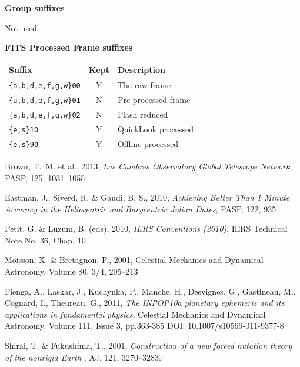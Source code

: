 \documentclass[twoside,11pt]{article}
\renewcommand{\_}{\texttt{\symbol{95}}}
\begin{document}
\vspace{0.5cm}

\textbf{Group suffixes}

\vspace{0.2cm}

Not used.

\vspace{0.5cm}

\textbf{FITS Processed Frame suffixes}

\vspace{0.2cm}

\begin{tabular}{l c l}
\hline
Suffix & Kept & Description \hspace{9cm}  \\
\hline
\texttt{\_\{a,b,d,e,f,g,w\}00} & Y & The raw frame\\
\texttt{\_\{a,b,d,e,f,g,w\}01}  & N & Pre-processed frame\\
\texttt{\_\{a,b,d,e,f,g,w\}02}  & N & Flash reduced\\
\texttt{\_\{e,s\}10}  & Y & QuickLook processed\\
\texttt{\_\{e,s\}90}  & Y & Offline processed\\
\hline
\end{tabular}


\begin{thebibliography}{}
 Brown, T.~M. et al., 2013, \textit{Las Cumbres
Observatory Global Telescope Network}, PASP, 125, 1031--1055

 Eastman, J., Siverd, R. \& Gaudi, B. S., 2010, \textit{Achieving Better Than 1 Minute Accuracy in the Heliocentric and Barycentric
Julian Dates}, PASP, 122, 935

 Petit, G. \& Luzum, B. (eds), 2010, \textit{IERS Conventions
(2010)}, IERS Technical Note No. 36, Chap. 10

 Moisson, X. \& Bretagnon, P., 2001, Celestial Mechanics and
Dynamical Astronomy, Volume 80, 3/4, 205--213

 Fienga, A., Laskar, J., Kuchynka, P., Manche, H., Desvignes,
G., Gastineau, M., Cognard, I., Theureau, G., 2011, \textit{The INPOP10a
planetary ephemeris and its applications in fundamental physics}, 
Celestial Mechanics and Dynamical Astronomy, Volume 111, Issue 3, pp.363-385
DOI: 10.1007/s10569-011-9377-8

 Shirai, T. \& Fukushima, T., 2001, \textit{Construction of a
new forced nutation theory of the nonrigid Earth }, AJ, 121, 3270--3283. 
\end{thebibliography}
\end{document}
